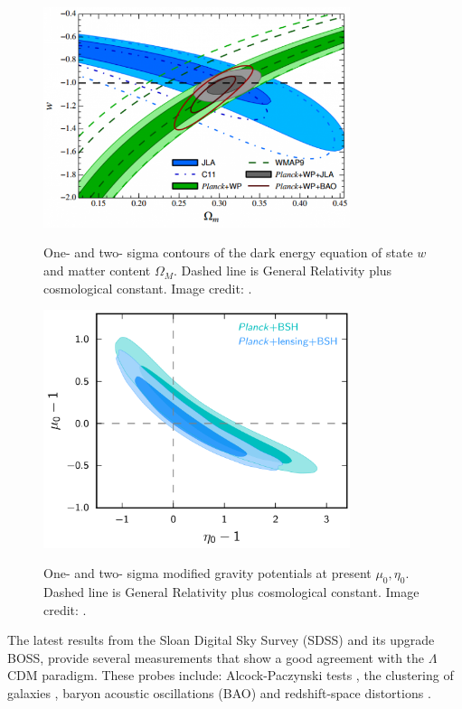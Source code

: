 \begin{figure}
\begin{center}
\includegraphics[width=0.8\textwidth]{./Pictures/JLA_w.png}
\caption{One- and two- sigma contours of the dark energy equation of state $w$ and matter content $\Omega_M$. Dashed line is General Relativity plus cosmological constant. Image credit: \cite{2014A&A...568A..22B}.}
\label{fig:jlaw0}
\vspace*{0.2cm}
\includegraphics[width=0.8\textwidth]{./Pictures/mg_planck2015.png}
\caption{One- and two- sigma modified gravity potentials at present $\mu_0,\eta_0$. Dashed line is General Relativity plus cosmological constant. Image credit: \cite{2016A&A...594A..14P}.}
\label{fig:mg_planck2015}
\end{center}
\end{figure}
The latest results from the Sloan Digital Sky Survey (SDSS) and its upgrade BOSS, provide several measurements that show a good agreement with the $\Lambda$CDM paradigm. These probes include: Alcock-Paczynski tests \cite{2016ApJ...832..103L}, the clustering of galaxies \cite{2016arXiv160703155A}, baryon acoustic oscillations (BAO) \cite{2016arXiv160703154W,2017arXiv170200176B,Ata:2017dya} and redshift-space distortions \cite{2017MNRAS.465.1757G}.
\newline

